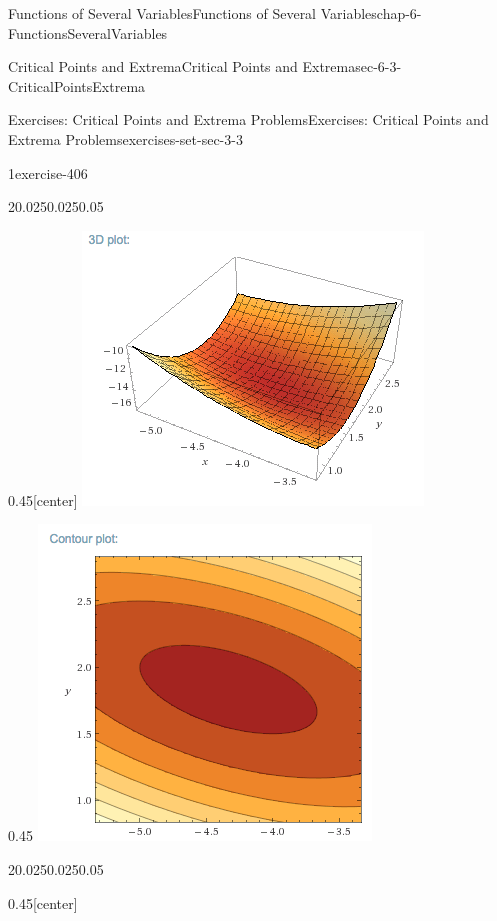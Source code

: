 \documentclass[oneside,10pt,]{book}
\numberwithin{equation}{section}
\begin{document}
\begin{chapterptx}{Functions of Several Variables}{}{Functions of Several Variables}{}{}{chap-6-FunctionsSeveralVariables}
\begin{sectionptx}{Critical Points and Extrema}{}{Critical Points and Extrema}{}{}{sec-6-3-CriticalPointsExtrema}
\begin{exercises-subsection-numberless}{Exercises: Critical Points and Extrema Problems}{}{Exercises: Critical Points and Extrema Problems}{}{}{exercises-set-sec-3-3}
\begin{divisionexercise}{1}{}{}{exercise-406}
\begin{itemize}[label=\textbullet]
\begin{sidebyside}{2}{0.025}{0.025}{0.05}
\begin{sbspanel}{0.45}[center]
\includegraphics[width=1\linewidth]{images/sec6-3-sol1c.png}
\end{sbspanel}%
\begin{sbspanel}{0.45}%
\includegraphics[width=1\linewidth]{images/sec6-3-sol1d.png}
\end{sbspanel}%
\end{sidebyside}%
\begin{sidebyside}{2}{0.025}{0.025}{0.05}%
\begin{sbspanel}{0.45}[center]%

\end{sbspanel}
\end{sidebyside}
\end{itemize}
\end{divisionexercise}
\end{exercises-subsection-numberless}
\end{sectionptx}
\end{chapterptx}
\end{document}

